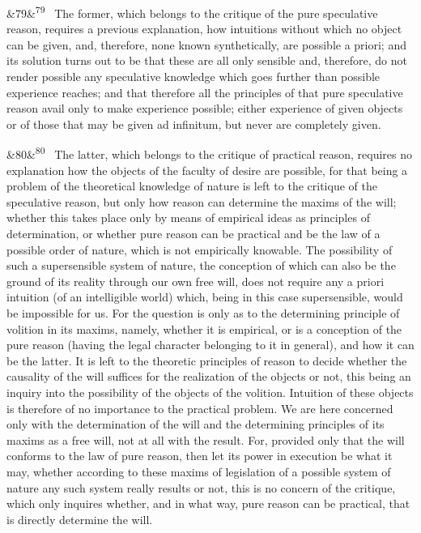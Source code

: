 \documentclass[12pt]{article}
\newcommand{\para}[1][]{\par\noindent\ifx&#1&\else\textsuperscript{\footnotesize #1}~\fi}
\begin{document}
\para[79] The former, which belongs to the critique of the pure speculative reason, requires a previous explanation, how intuitions without which no object can be given, and, therefore, none known synthetically, are possible a priori; and its solution turns out to be that these are all only sensible and, therefore, do not render possible any speculative knowledge which goes further than possible experience reaches; and that therefore all the principles of that pure speculative reason avail only to make experience possible; either experience of given objects or of those that may be given ad infinitum, but never are completely given.

\para[80] The latter, which belongs to the critique of practical reason, requires no explanation how the objects of the faculty of desire are possible, for that being a problem of the theoretical knowledge of nature is left to the critique of the speculative reason, but only how reason can determine the maxims of the will; whether this takes place only by means of empirical ideas as principles of determination, or whether pure reason can be practical and be the law of a possible order of nature, which is not empirically knowable. The possibility of such a supersensible system of nature, the conception of which can also be the ground of its reality through our own free will, does not require any a priori intuition (of an intelligible world) which, being in this case supersensible, would be impossible for us. For the question is only as to the determining principle of volition in its maxims, namely, whether it is empirical, or is a conception of the pure reason (having the legal character belonging to it in general), and how it can be the latter. It is left to the theoretic principles of reason to decide whether the causality of the will suffices for the realization of the objects or not, this being an inquiry into the possibility of the objects of the volition. Intuition of these objects is therefore of no importance to the practical problem. We are here concerned only with the determination of the will and the determining principles of its maxims as a free will, not at all with the result. For, provided only that the will conforms to the law of pure reason, then let its power in execution be what it may, whether according to these maxims of legislation of a possible system of nature any such system really results or not, this is no concern of the critique, which only inquires whether, and in what way, pure reason can be practical, that is directly determine the will.
\end{document}
